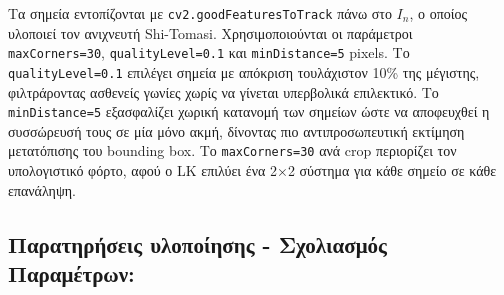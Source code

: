 \documentclass[12pt]{article}
\begin{document}
Τα σημεία εντοπίζονται με \texttt{cv2.goodFeaturesToTrack} πάνω στο $I_n$, ο οποίος υλοποιεί τον ανιχνευτή Shi-Tomasi. Χρησιμοποιούνται οι παράμετροι \texttt{maxCorners=30}, \texttt{qualityLevel=0.1} και \texttt{minDistance=5} pixels. Το \texttt{qualityLevel=0.1} επιλέγει σημεία με απόκριση τουλάχιστον 10\% της μέγιστης, φιλτράροντας ασθενείς γωνίες χωρίς να γίνεται υπερβολικά επιλεκτικό. Το \texttt{minDistance=5} εξασφαλίζει χωρική κατανομή των σημείων ώστε να αποφευχθεί η συσσώρευσή τους σε μία μόνο ακμή, δίνοντας πιο αντιπροσωπευτική εκτίμηση μετατόπισης του bounding box. Το \texttt{maxCorners=30} ανά crop περιορίζει τον υπολογιστικό φόρτο, αφού ο LK επιλύει ένα 2×2 σύστημα για κάθε σημείο σε κάθε επανάληψη.

\subsection*{Παρατηρήσεις υλοποίησης - Σχολιασμός Παραμέτρων:}
\end{document}
